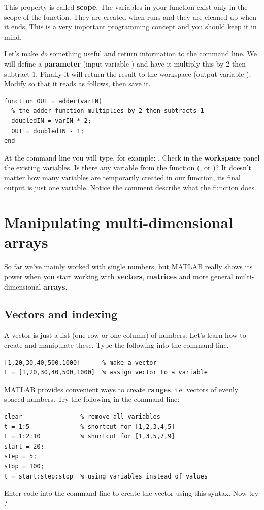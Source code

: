 \documentclass{article}
\begin{document}
This property is called \textbf{scope}.
The variables in your  function exist only in the scope of the  function.
They are created when  runs and they are cleaned up when it ends.
This is a very important programming concept and you should keep it in mind.

Let's make  \emph{do} something useful and return information to the command line.
We will define a \textbf{parameter} (input variable ) and have it multiply this by 2 then subtract 1.
Finally it will return the result to the workspace (output variable ).
Modify  so that it reads as follows, then save it.
\begin{lstlisting}
function OUT = adder(varIN)
  % the adder function multiplies by 2 then subtracts 1
  doubledIN = varIN * 2;
  OUT = doubledIN - 1;
end
\end{lstlisting}

At the command line you will type, for example: .
Check in the \textbf{workspace} panel the existing variables.
Is there any variable from the function (,  or )?
It doesn't matter how many variables are temporarily created in our function, its final output is just one variable.
Notice the comment describe what the function does. 


\section{Manipulating multi-dimensional arrays}

So far we've mainly worked with single numbers, but MATLAB really shows its power when you start working with \textbf{vectors}, \textbf{matrices} and more general multi-dimensional \textbf{arrays}.


\subsection{Vectors and indexing}

A vector is just a list (one row or one column) of numbers.
Let's learn how to create and manipulate these.
Type the following into the command line.
\begin{lstlisting}
[1,20,30,40,500,1000]      % make a vector
t = [1,20,30,40,500,1000]  % assign vector to a variable
\end{lstlisting}

MATLAB provides convenient ways to create \textbf{ranges}, i.e. vectors of evenly spaced numbers.
Try the following in the command line:
\begin{lstlisting}
clear                % remove all variables
t = 1:5              % shortcut for [1,2,3,4,5]
t = 1:2:10           % shortcut for [1,3,5,7,9]
start = 20;
step = 5;
stop = 100;
t = start:step:stop  % using variables instead of values
\end{lstlisting}
Enter code into the command line to create the vector \mcode{[5,8,11,14]} using this syntax. 
Now try \mcode{[-1,-2,-3,-4]}?
\end{document}
